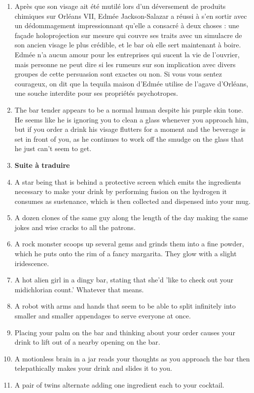\documentclass{article}
\begin{document}
\begin{enumerate}
	\item Après que son visage ait été mutilé lors d'un déversement de produits chimiques sur Orléans VII, Edmée Jackson-Salazar a réussi à s'en sortir avec un dédommagement impressionnant qu'elle a consacré à deux choses : une façade holoprojection sur mesure qui couvre ses traits avec un simulacre de son ancien visage le plus crédible, et le bar où elle sert maintenant à boire. Edmée n'a aucun amour pour les entreprises qui sucent la vie de l'ouvrier, mais personne ne peut dire si les rumeurs sur son implication avec divers groupes de cette persuasion sont exactes ou non. Si vous vous sentez courageux, on dit que la tequila maison d'Edmée utilise de l'agave d'Orléans, une souche interdite pour ses propriétés psychotropes.\item The bar tender appears to be a normal human despite his purple skin tone. He seems like he is ignoring you to clean a glass whenever you approach him, but if you order a drink his visage flutters for a moment and the beverage is set in front of you, as he continues to work off the smudge on the glass that he just can't seem to get.
	\item \textbf{Suite à traduire}
	\item A star being that is behind a protective screen which emits the ingredients necessary to make your drink by performing fusion on the hydrogen it consumes as sustenance, which is then collected and dispensed into your mug.
	\item A dozen clones of the same guy along the length of the day making the same jokes and wise cracks to all the patrons.
	\item A rock monster scoops up several gems and grinds them into a fine powder, which he puts onto the rim of a fancy margarita. They glow with a slight iridescence.
	\item A hot alien girl in a dingy bar, stating that she'd 'like to check out your midichlorian count.' Whatever that means.
	\item A robot with arms and hands that seem to be able to split infinitely into smaller and smaller appendages to serve everyone at once.
	\item Placing your palm on the bar and thinking about your order causes your drink to lift out of a nearby opening on the bar.
	\item A motionless brain in a jar reads your thoughts as you approach the bar then telepathically makes your drink and slides it to you.
	\item A pair of twins alternate adding one ingredient each to your cocktail.

\end{enumerate}
\end{document}

